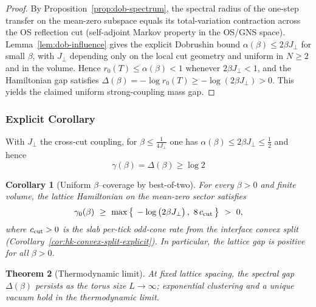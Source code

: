\documentclass[11pt]{amsart}
\theoremstyle{plain}
\newtheorem{theorem}{Theorem}[section]
\newtheorem{corollary}[theorem]{Corollary}
\theoremstyle{definition}
\theoremstyle{remark}
\renewcommand{\tfrac}[2]{\textstyle\frac{#1}{#2}}
\begin{document}
\begin{proof}
By Proposition~\ref{prop:dob-spectrum}, the spectral radius of the one-step transfer on the mean-zero subspace equals its total-variation contraction across the OS reflection cut (self-adjoint Markov property in the OS/GNS space). Lemma~\ref{lem:dob-influence} gives the explicit Dobrushin bound $\alpha(\beta)\le 2\beta J_{\perp}$ for small $\beta$, with $J_{\perp}$ depending only on the local cut geometry and uniform in $N\ge 2$ and in the volume. Hence $r_0(T)\le \alpha(\beta)<1$ whenever $2\beta J_{\perp}<1$, and the Hamiltonian gap satisfies $\Delta(\beta)=-\log r_0(T)\ge -\log(2\beta J_{\perp})>0$. This yields the claimed uniform strong-coupling mass gap.
\end{proof}

\begin{mdframed}[linewidth=0.5pt, linecolor=orange!40, backgroundcolor=orange!3, roundcorner=2pt, innertopmargin=8pt, innerbottommargin=8pt, skipabove=10pt, skipbelow=10pt]
\subsubsection*{Explicit Corollary}
With $J_{\perp}$ the cross-cut coupling, for $\beta\le \frac{1}{4J_{\perp}}$ one has $\alpha(\beta)\le 2\beta J_{\perp}\le \tfrac12$ and hence
\begin{equation}
  \boxed{\gamma(\beta)=\Delta(\beta) \ge \log 2}
\end{equation}
\end{mdframed}

\begin{corollary}[Uniform $\beta$--coverage by best-of-two]
For every $\beta>0$ and finite volume, the lattice Hamiltonian on the mean-zero sector satisfies
\[
  \gamma_0(\beta)\ \ge\ \max\big\{\,-\log\big(2\beta J_{\perp}\big)\,,\ 8\,c_{\rm cut}\,\big\}\ >\ 0,
\]
where $c_{\rm cut}>0$ is the slab per-tick odd-cone rate from the interface convex split (Corollary~\ref{cor:hk-convex-split-explicit}). In particular, the lattice gap is positive for all $\beta>0$.
\end{corollary}

\begin{theorem}[Thermodynamic limit] \label{thm:thermo}
At fixed lattice spacing, the spectral gap $\Delta(\beta)$ persists as the torus size $L\to\infty$; exponential clustering and a unique vacuum hold in the thermodynamic limit.
\end{theorem}
\end{document}
